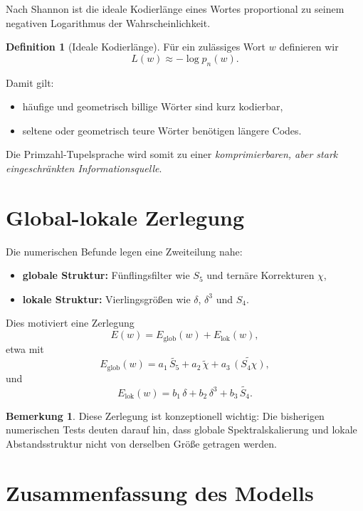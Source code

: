 \documentclass[11pt,a4paper]{article}
\theoremstyle{definition}
\newtheorem{definition}{Definition}[section]
\newtheorem{remark}{Bemerkung}[section]
\begin{document}
	Nach Shannon ist die ideale Kodierlänge eines Wortes proportional zu seinem negativen Logarithmus der Wahrscheinlichkeit.
	
	\begin{definition}[Ideale Kodierlänge]
		Für ein zulässiges Wort \(w\) definieren wir
		\[
		L(w)\approx -\log p_n(w).
		\]
	\end{definition}
	
	Damit gilt:
	\begin{itemize}
		\item häufige und geometrisch billige Wörter sind kurz kodierbar,
		\item seltene oder geometrisch teure Wörter benötigen längere Codes.
	\end{itemize}
	
	Die Primzahl-Tupelsprache wird somit zu einer \emph{komprimierbaren, aber stark eingeschränkten Informationsquelle}.
	
	\section{Global-lokale Zerlegung}
	
	Die numerischen Befunde legen eine Zweiteilung nahe:
	
	\begin{itemize}
		\item \textbf{globale Struktur:} Fünflingsfilter wie \(S_5\) und ternäre Korrekturen \(\chi\),
		\item \textbf{lokale Struktur:} Vierlingsgrößen wie \(\delta\), \(\delta^3\) und \(S_4\).
	\end{itemize}
	
	Dies motiviert eine Zerlegung
	\[
	E(w)=E_{\mathrm{glob}}(w)+E_{\mathrm{lok}}(w),
	\]
	etwa mit
	\[
	E_{\mathrm{glob}}(w)
	=
	a_1\,\widetilde{S_5}
	+
	a_2\,\widetilde{\chi}
	+
	a_3\,\widetilde{(S_4\chi)},
	\]
	und
	\[
	E_{\mathrm{lok}}(w)
	=
	b_1\,\delta
	+
	b_2\,\delta^3
	+
	b_3\,\widetilde{S_4}.
	\]
	
	\begin{remark}
		Diese Zerlegung ist konzeptionell wichtig: Die bisherigen numerischen Tests deuten darauf hin, dass globale Spektralskalierung und lokale Abstandsstruktur nicht von derselben Größe getragen werden.
	\end{remark}
	
	\section{Zusammenfassung des Modells}
	
\end{document}
